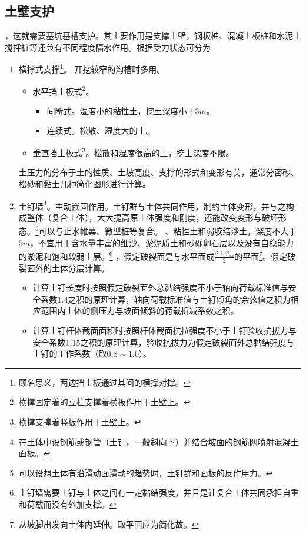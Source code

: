 \documentclass{book}
\begin{document}
\subsection{土壁支护}
，这就需要基坑基槽支护。其主要作用是支撑土壁，钢板桩、混凝土板桩和水泥土搅拌桩等还兼有不同程度隔水作用。根据受力状态可分为
\begin{enumerate}
    \item 横撑式支撑\footnote{顾名思义，两边挡土板通过其间的横撑对撑。}。
          开挖较窄的沟槽时多用。
          \begin{itemize}
              \item 水平挡土板式\footnote{横撑固定着的立柱支撑着横板作用于土壁上。}。
                    \begin{itemize}
                        \item 间断式。湿度小的黏性土，挖土深度小于$3m$。
                        \item 连续式。松散、湿度大的土。
                    \end{itemize}
              \item 垂直挡土板式\footnote{横撑支撑着竖板作用于土壁上。}。松散和湿度很高的土，挖土深度不限。
          \end{itemize}
          土压力的分布于土的性质、土坡高度、支撑的形式和变形有关，通常分密砂、松砂和黏土几种简化图形进行计算。
    \item 土钉墙\footnote{在土体中设钢筋或钢管（土钉，一般斜向下）并结合坡面的钢筋网喷射混凝土面板。}。主动嵌固作用。土钉群与土体共同作用，制约土体变形，并与之构成整体（复合土体），大大提高原土体强度和刚度，还能改变变形与破坏形态。\footnote{可以设想土体有沿滑动面滑动的趋势时，土钉群和面板的反作用力。}可以与止水帷幕、微型桩等复合。
          、粘性土和弱胶结沙土，深度不大于$5m$，不宜用于含水量丰富的细沙、淤泥质土和砂砾卵石层以及没有自稳能力的淤泥和饱和软弱土层。\footnote{土钉墙需要土钉与土体之间有一定黏结强度，并且是让复合土体共同承担自重和荷载而没有外加支撑。}
          ，假定破裂面是与水平面成$\frac{\beta+\varphi_{ak}}{2}$的平面\footnote{从坡脚出发向土体内延伸。取平面应为简化故。}。假定破裂面外的土体分层计算。
          \begin{itemize}
              \item 计算土钉长度时按照假定破裂面外总黏结强度不小于轴向荷载标准值与安全系数$1.4$之积的原理计算，轴向荷载标准值与土钉倾角的余弦值之积为相应范围内土体的侧压力与坡面倾斜的荷载折减系数之积。
              \item 计算土钉杆体截面面积时按照杆体截面抗拉强度不小于土钉验收抗拔力与安全系数$1.15$之积的原理计算，验收抗拔力为假定破裂面外总黏结强度与土钉的工作系数（取$0.8\sim1.0$）。

\end{itemize}
\end{enumerate}
\end{document}
